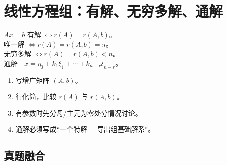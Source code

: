﻿\documentclass[11pt,a4paper,UTF8]{ctexart}
\begin{document}
\section{线性方程组：有解、无穷多解、通解}

\begin{identifybox}[高亮公式]
$Ax=b$ 有解 $\Longleftrightarrow r(A)=r(A,b)$。\\
唯一解 $\Longleftrightarrow r(A)=r(A,b)=n$。\\
无穷多解 $\Longleftrightarrow r(A)=r(A,b)<n$。\\
通解：$x=\eta_0+k_1\xi_1+\cdots+k_{n-r}\xi_{n-r}$。\\
\end{identifybox}

\begin{templatebox}[考场模板]

\begin{enumerate}
\item 写增广矩阵 $(A,b)$。
\item 行化简，比较 $r(A)$ 与 $r(A,b)$。
\item 有参数时先分母/主元为零处分情况讨论。
\item 通解必须写成“一个特解 + 导出组基础解系”。
\end{enumerate}

\end{templatebox}
\subsection{真题融合}
\end{document}
